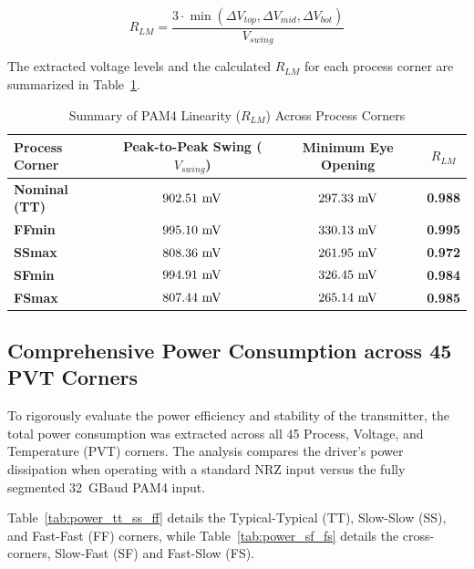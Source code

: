 \begin{equation}
    R_{LM} = \frac{3 \cdot \min(\Delta V_{top}, \Delta V_{mid}, \Delta V_{bot})}{V_{swing}}
\end{equation}

The extracted voltage levels and the calculated $R_{LM}$ for each process corner are summarized in Table~\ref{tab:rlm_summary}.

\begin{table}[H]
    \centering
    \caption{Summary of PAM4 Linearity ($R_{LM}$) Across Process Corners}
    \label{tab:rlm_summary}
    \renewcommand{\arraystretch}{1.3} %
    \begin{tabular}{lccc}
        \toprule
        \textbf{Process Corner} & \textbf{Peak-to-Peak Swing ($V_{swing}$)} & \textbf{Minimum Eye Opening} & \textbf{$R_{LM}$} \\
        \midrule
        \textbf{Nominal (TT)} & $902.51~\text{mV}$ & $297.33~\text{mV}$ & \textbf{0.988} \\
        \textbf{FFmin}        & $995.10~\text{mV}$ & $330.13~\text{mV}$ & \textbf{0.995} \\
        \textbf{SSmax}        & $808.36~\text{mV}$ & $261.95~\text{mV}$ & \textbf{0.972} \\
        \textbf{SFmin}        & $994.91~\text{mV}$ & $326.45~\text{mV}$ & \textbf{0.984} \\
        \textbf{FSmax}        & $807.44~\text{mV}$ & $265.14~\text{mV}$ & \textbf{0.985} \\
        \bottomrule
    \end{tabular}
\end{table}

\subsection{Comprehensive Power Consumption across 45 PVT Corners}
To rigorously evaluate the power efficiency and stability of the transmitter, the total power consumption was extracted across all 45 Process, Voltage, and Temperature (PVT) corners. The analysis compares the driver's power dissipation when operating with a standard NRZ input versus the fully segmented 32~GBaud PAM4 input. 

Table~\ref{tab:power_tt_ss_ff} details the Typical-Typical (TT), Slow-Slow (SS), and Fast-Fast (FF) corners, while Table~\ref{tab:power_sf_fs} details the cross-corners, Slow-Fast (SF) and Fast-Slow (FS).

